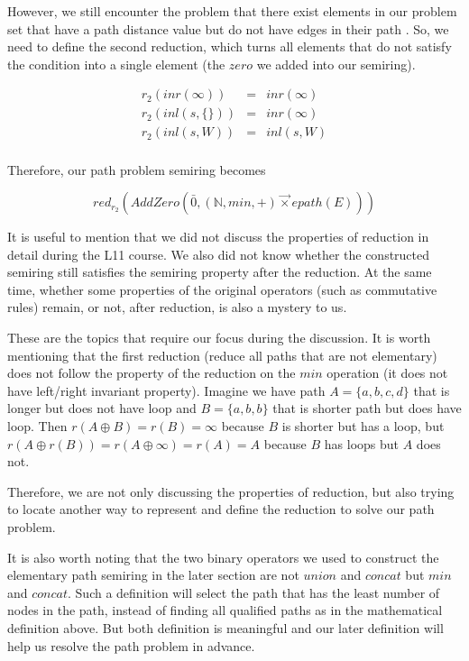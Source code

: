\documentclass[a4paper,12pt,twoside,openright]{report}
\newcommand{\e}[2]{
\begin{equation}
  \label{#1} 
  #2
\end{equation}
}
\begin{document}
However, we still encounter the problem that there exist elements in our problem set that have a path distance value but do not have edges in their path . So, we need to define the second reduction, which turns all elements that do not satisfy the condition into a single element (the $zero$ we added into our semiring).
\e{r:def:reduction_annihilator}{
\begin{array}{rcl} 
r_2 (inr(\infty)) & = & inr(\infty) \\
r_2 (inl(s,\{\})) & = & inr(\infty) \\
r_2 (inl(s,W)) & = & inl(s,W) \\
\end{array}}
Therefore, our path problem semiring becomes 
\e{r:def:reduced_path_problem}{red_{r_2}(AddZero(\bar0,(\mathbb{N},min,+) \overrightarrow{\times} epath(E)))}

It is useful to mention that we did not discuss the properties of reduction in detail during the L11 course. We also did not know whether the constructed semiring still satisfies the semiring property after the reduction. At the same time, whether some properties of the original operators (such as commutative rules) remain, or not, after reduction, is also a mystery to us.

These are the topics that require our focus during the discussion.
It is worth mentioning that the first reduction (reduce all paths that are not elementary) does not follow the property of the reduction on the $min$ operation (it does not have left/right invariant property). Imagine we have path $A = \{a,b,c,d\}$ that is longer but does not have loop and $B = \{a,b,b\}$ that is shorter path but does have loop. Then $r(A\oplus B) = r(B) = \infty$ because $B$ is shorter but has a loop, but $r(A\oplus r(B)) = r(A \oplus \infty) = r(A) = A$ because $B$ has loops but $A$ does not.

Therefore, we are not only discussing the properties of reduction, but also trying to locate another way to represent and define the reduction to solve our path problem.

It is also worth noting that the two binary operators we used to construct the elementary path semiring in the later section are not $union$ and $concat$ but $min$ and $concat$. 
Such a definition will select the path that has the least number of nodes in the path, instead of finding all qualified paths as in the mathematical definition above. But both definition is meaningful and our later definition will help us resolve the path problem in advance.
\end{document}
